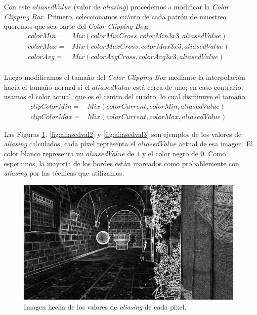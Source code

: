 \documentclass[pregrado]{tesis-usb} %
\begin{document}
Con este $aliasedValue$ (valor de \textit{aliasing}) procedemos a modificar la \textit{Color Clipping Box}. Primero, seleccionamos cuánto de cada patrón de muestreo queremos que sea parte del \textit{Color Clipping Box}:
\begin{equation}\label{eq:newcolors}
\begin{split}
colorMin= & Mix(colorMinCross,colorMin3x3,aliasedValue) \\
colorMax= & Mix(colorMaxCross,colorMax3x3,aliasedValue) \\
colorAvg= & Mix(colorAvgCross,colorAvg3x3,aliasedValue) \\
\end{split}
\end{equation}

Luego modificamos el tamaño del \textit{Color Clipping Box} mediante la interpolación hacia el tamaño normal si el $aliasedValue$ está cerca de uno; en caso contrario, usamos el color actual, que es el centro del cuadro, lo cual disminuye el tamaño.
\begin{equation}\label{eq:clipredux}
\begin{split}
	clipColorMin= & Mix(colorCurrent,colorMin,aliasedValue) \\
	clipColorMax= & Mix(colorCurrent,colorMax,aliasedValue)
\end{split}
\end{equation}



Las Figuras \ref{fig:aliasedval1}, \ref{fig:aliasedval2} y \ref{fig:aliasedval3} son ejemplos de los valores de \textit{aliasing} calculados, cada píxel representa el $aliasedValue$ actual de esa imagen. El color blanco representa un $aliasedValue$ de $1$ y el color negro de $0$. Como esperamos, la mayoría de los bordes están marcados como probablemente con \textit{aliasing} por las técnicas que utilizamos.

\begin{figure}[H]
	\centering
	\includegraphics[scale=0.2]{images/aliased_value_example_1_temporal.png}
	\caption{Imagen hecha de los valores de \textit{aliasing} de cada píxel.}\label{fig:aliasedval1}
\end{figure}
\end{document}
